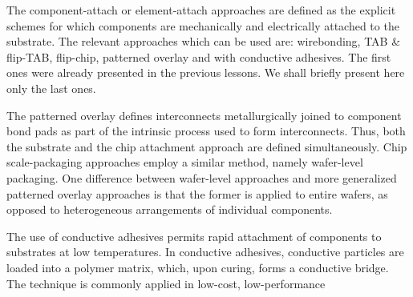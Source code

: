 \begin{spacing}{1.5}
The component-attach or element-attach approaches are defined as the explicit schemes for which components are mechanically and electrically attached to the substrate. The relevant approaches which can be used are: wirebonding, TAB \& flip-TAB, flip-chip, patterned overlay and with conductive adhesives. The first ones were already presented in the previous lessons. We shall briefly present here only the last ones.

The patterned overlay defines interconnects metallurgically joined to component bond pads as part of the intrinsic process used to form interconnects. Thus, both the substrate and the chip attachment approach are defined simultaneously. Chip scale-packaging approaches employ a similar method, namely wafer-level packaging. One difference between wafer-level approaches and more generalized patterned overlay approaches is that the former is applied to entire wafers, as opposed to heterogeneous arrangements of individual components. 

The use of conductive adhesives permits rapid attachment of components to substrates at low temperatures. In conductive adhesives, conductive particles are loaded into a polymer matrix, which, upon curing, forms a conductive bridge. The technique is commonly applied in low-cost, low-performance

\end{spacing}
\newpage
